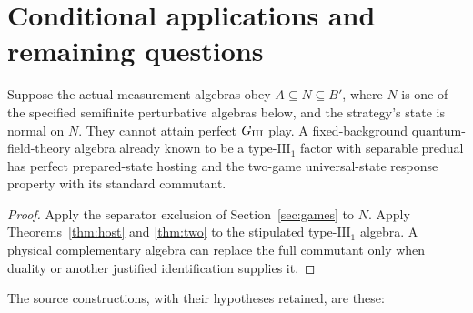 \section{Conditional applications and remaining questions}\label{sec:scope}
\begin{corollary}\label{cor:gravity}
Suppose the actual measurement algebras obey $A\subseteq N\subseteq B'$, where $N$ is one of the specified semifinite perturbative algebras below, and the strategy's state is normal on $N$. They cannot attain perfect $G_{\mathrm{III}}$ play. A fixed-background quantum-field-theory algebra already known to be a type-$\mathrm{III}_1$ factor with separable predual has perfect prepared-state hosting and the two-game universal-state response property with its standard commutant.
\end{corollary}
\begin{proof}
Apply the separator exclusion of Section~\ref{sec:games} to $N$. Apply Theorems~\ref{thm:host} and \ref{thm:two} to the stipulated type-$\mathrm{III}_1$ algebra. A physical complementary algebra can replace the full commutant only when duality or another justified identification supplies it.
\end{proof}
The source constructions, with their hypotheses retained, are these:
